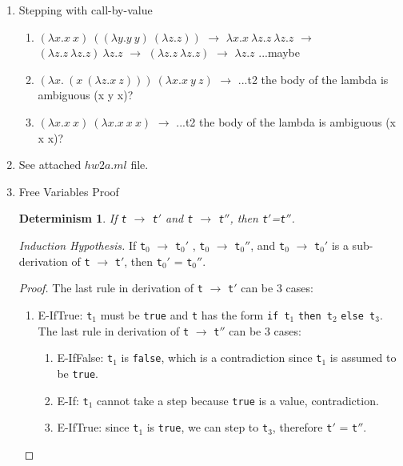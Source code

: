 \documentclass{article}
\newtheorem{deter}{Determinism}
\begin{document}
\begin{description}
\begin{enumerate}
\begin{enumerate}
    \end{enumerate}

  \item{Stepping with call-by-value}
    \begin{enumerate}
    \item $(\lambda x.x\ x)\ ((\lambda y.y\ y)\ (\lambda z.z))$ $\longrightarrow$
          $\lambda x.x\ \lambda z.z\ \lambda z.z$ $\longrightarrow$
          $(\lambda z.z\ \lambda z.z)\ \lambda z.z$ $\longrightarrow$
          $(\lambda z.z\ \lambda z.z)$ $\longrightarrow$
          $\lambda z.z$
          ...maybe

    \item $(\lambda x.\ (x\ (\lambda z.x\ z)))\ (\lambda x.x\ y\ z)$ $\longrightarrow$
          ...t2 the body of the lambda is ambiguous (x y x)?

    \item $(\lambda x.x\ x)\ (\lambda x.x\ x\ x)$ $\longrightarrow$
          ...t2 the body of the lambda is ambiguous (x x x)?


    \end{enumerate}

  \item{See attached $hw2a.ml$ file.}

  \item{Free Variables Proof}
    \begin{deter}If \verb|t| $\longrightarrow$ \verb|t|$'$ and \verb|t| $\longrightarrow$ \verb|t|$''$, then \verb|t|$'$=\verb|t|$''$.
    \end{deter}

    \textit{Induction Hypothesis.} If \verb|t|$_0$ $\longrightarrow$ \verb|t|$_0'$ , \verb|t|$_0$ $\longrightarrow$ \verb|t|$_0''$, and \verb|t|$_0$ $\longrightarrow$ \verb|t|$_0'$ is a sub-derivation of \verb|t| $\longrightarrow$ \verb|t|$'$, then \verb|t|$_0'$ = \verb|t|$_0''$.

    \begin{proof}
      The last rule in derivation of \verb|t| $\longrightarrow$ \verb|t|$'$ can be 3 cases:
      \begin{enumerate}
        \item E-IfTrue: \verb|t|$_1$ must be \verb|true| and \verb|t| has the form
        \verb|if t|$_1$ \verb|then t|$_2$ \verb|else t|$_3$.
          The last rule in derivation of \verb|t| $\longrightarrow$ \verb|t|$''$ can be 3 cases:
          \begin{enumerate}
            \item E-IfFalse: \verb|t|$_1$ is \verb|false|, which is a contradiction since \verb|t|$_1$ is assumed to be \verb|true|.
            \item E-If: \verb|t|$_1$ cannot take a step because \verb|true| is a value, contradiction.
            \item E-IfTrue: since \verb|t|$_1$ is \verb|true|, we can step to \verb|t|$_3$, therefore \verb|t|$'$ = \verb|t|$''$.
          \end{enumerate}


\end{enumerate}
\end{proof}
\end{enumerate}
\end{description}
\end{document}
